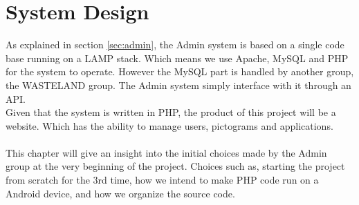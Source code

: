 \chapter{System Design}
\label{systemDesign}
As explained in section \vref{sec:admin}, the Admin system is based on a single code base running on a LAMP stack. Which means we use Apache, MySQL and PHP for the system to operate. However the MySQL part is handled by another group, the WASTELAND group. The Admin system simply interface with it through an API.\\
Given that the system is written in PHP, the product of this project will be a website. Which has the ability to manage users, pictograms and applications.\\
\\
This chapter will give an insight into the initial choices made by the Admin group at the very beginning of the project. Choices such as, starting the project from scratch for the 3rd time, how we intend to make PHP code run on a Android device, and how we organize the source code.


